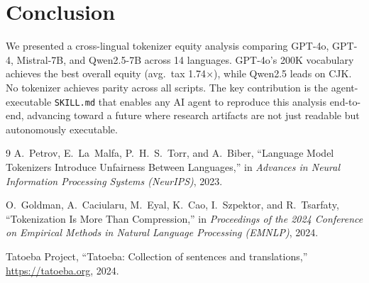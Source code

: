 \documentclass[11pt]{article}
\begin{document}
\section{Conclusion}

We presented a cross-lingual tokenizer equity analysis comparing GPT-4o, GPT-4, Mistral-7B, and Qwen2.5-7B across 14 languages.
GPT-4o's 200K vocabulary achieves the best overall equity (avg.\ tax 1.74$\times$), while Qwen2.5 leads on CJK.
No tokenizer achieves parity across all scripts.
The key contribution is the agent-executable \texttt{SKILL.md} that enables any AI agent to reproduce this analysis end-to-end, advancing toward a future where research artifacts are not just readable but autonomously executable.

\begin{thebibliography}{9}
A.~Petrov, E.~La~Malfa, P.~H.~S.~Torr, and A.~Biber,
``Language Model Tokenizers Introduce Unfairness Between Languages,''
in \emph{Advances in Neural Information Processing Systems (NeurIPS)}, 2023.

O.~Goldman, A.~Caciularu, M.~Eyal, K.~Cao, I.~Szpektor, and R.~Tsarfaty,
``Tokenization Is More Than Compression,''
in \emph{Proceedings of the 2024 Conference on Empirical Methods in Natural Language Processing (EMNLP)}, 2024.

Tatoeba Project,
``Tatoeba: Collection of sentences and translations,''
\url{https://tatoeba.org}, 2024.
\end{thebibliography}
\end{document}
